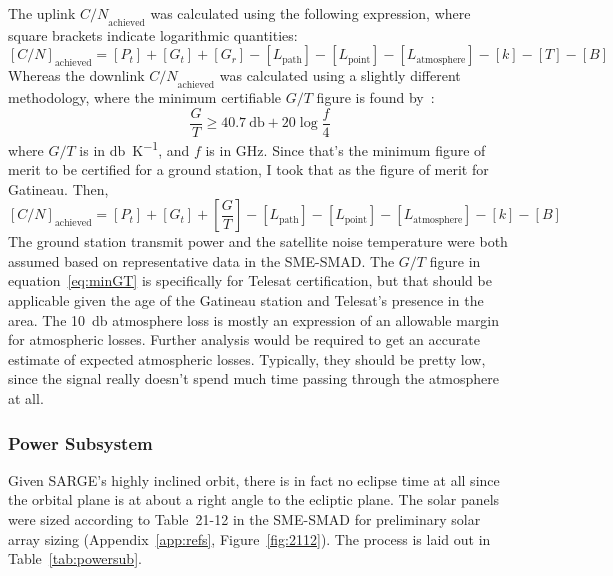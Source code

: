 \documentclass[9pt]{article}
\begin{document}
The uplink ${C/N}_\text{achieved}$ was calculated using the following expression, where square brackets indicate logarithmic quantities:
\begin{equation}\label{eq:uplinkachieved}
  [C/N]_\text{achieved}=[P_t] + [G_t] + [G_r] - [L_\text{path}] - [L_\text{point}] - [L_\text{atmosphere}] - [k] -[T]-[B]
\end{equation}
Whereas the downlink ${C/N}_\text{achieved}$ was calculated using a slightly different methodology, where the minimum certifiable $G/T$ figure is found by~\cite[I, p. 40]{commlinks}:
\begin{equation}\label{eq:minGT}
  \frac GT\ge \qty{40.7}{\decibel}+20\log{\frac f4}
\end{equation}
where $G/T$ is in \si{\decibel\per\kelvin}, and $f$ is in \si{\giga\hertz}.
Since that's the minimum figure of merit to be certified for a ground station, I took that as the figure of merit for Gatineau.
Then,
\begin{equation}\label{eq:downlinkachieved}
  [{C/N}]_\text{achieved}=[P_t]+[G_t]+\left[\frac GT\right]-[L_\text{path}]-[L_\text{point}]-[L_\text{atmosphere}]-[k]-[B]
\end{equation}
The ground station transmit power and the satellite noise temperature were both assumed based on representative data in the SME-SMAD.
The $G/T$ figure in equation~\ref{eq:minGT} is specifically for Telesat certification, but that should be applicable given the age of the Gatineau station and Telesat's presence in the area.
The \qty{10}{\decibel} atmosphere loss is mostly an expression of an allowable margin for atmospheric losses.
Further analysis would be required to get an accurate estimate of expected atmospheric losses.
Typically, they should be pretty low, since the signal really doesn't spend much time passing through the atmosphere at all.

\subsubsection{Power Subsystem}\label{sys:power}

Given SARGE's highly inclined orbit, there is in fact no eclipse time at all since the orbital plane is at about a right angle to the ecliptic plane.
The solar panels were sized according to Table~21-12 in the SME-SMAD for preliminary solar array sizing (Appendix~\ref{app:refs}, Figure~\ref{fig:2112}).
The process is laid out in Table~\ref{tab:powersub}.
\end{document}
